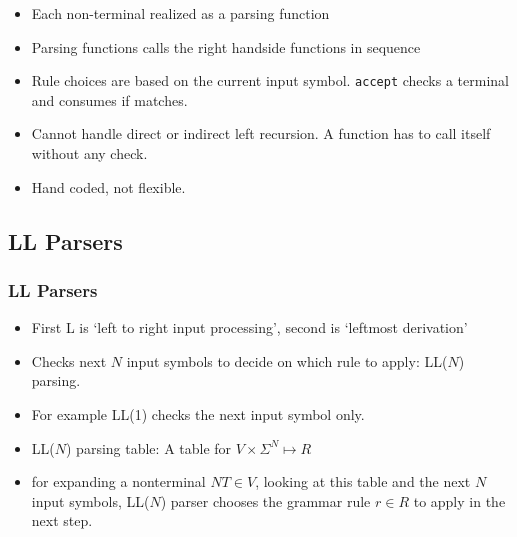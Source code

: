 \begin{frame}
\begin{itemize}
\item Each non-terminal realized as a parsing function
\item Parsing functions calls the right handside functions in sequence
\item Rule choices are based on the current input symbol. \texttt{accept}
	checks a terminal and consumes if matches.
\item Cannot handle direct or indirect left recursion. A function has to call 
	itself without any check.
\item Hand coded, not flexible.
\end{itemize}
\end{frame}

\begin{frame}
\subsection{LL Parsers}
\frametitle{LL Parsers}
\begin{itemize}
\item First L is `left to right input processing', second is 
	`leftmost derivation'
\item Checks next $N$ input symbols to decide on which rule to apply: LL($N$) parsing.
\item For example LL(1) checks the next input symbol only.
\item LL($N$) parsing table: A table for $V \times \Sigma^{N} \mapsto R$
\item for expanding a nonterminal $NT \in V$, looking at this table and the next $N$ input symbols, LL($N$) parser chooses the grammar rule $r \in R$ to apply in the next step.
\end{itemize}
\end{frame}

